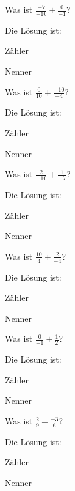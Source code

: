 \documentclass{ximera}
\begin{document}
\begin{shuffle}
    
\begin{question}
Was ist $\frac{-7}{-10} + \frac{0}{-1}$?
\begin{solution}
Die Lösung ist:

Zähler 

Nenner 
\end{solution}
\end{question}


\begin{question}
Was ist $\frac{0}{10} + \frac{-10}{-4}$?
\begin{solution}
Die Lösung ist:

Zähler 

Nenner 
\end{solution}
\end{question}


\begin{question}
Was ist $\frac{2}{-10} + \frac{1}{-7}$?
\begin{solution}
Die Lösung ist:

Zähler 

Nenner 
\end{solution}
\end{question}


\begin{question}
Was ist $\frac{10}{4} + \frac{2}{-4}$?
\begin{solution}
Die Lösung ist:

Zähler 

Nenner 
\end{solution}
\end{question}


\begin{question}
Was ist $\frac{0}{-1} + \frac{1}{2}$?
\begin{solution}
Die Lösung ist:

Zähler 

Nenner 
\end{solution}
\end{question}


\begin{question}
Was ist $\frac{2}{9} + \frac{-3}{6}$?
\begin{solution}
Die Lösung ist:

Zähler 

Nenner 
\end{solution}
\end{question}



\end{shuffle}
\end{document}

